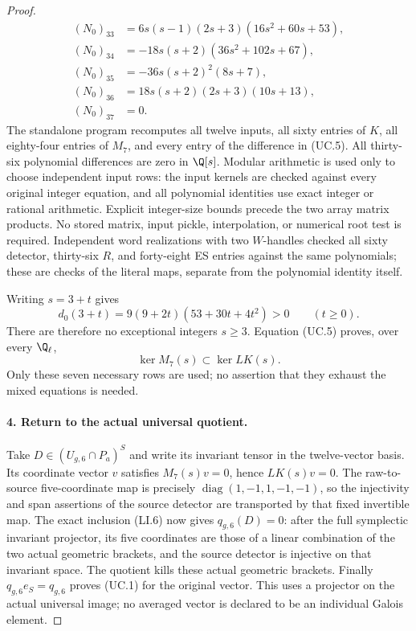\begin{proof}
\begin{align*}
 (N_0)_{33}&=6s(s-1)(2s+3)(16s^2+60s+53),\\
 (N_0)_{34}&=-18s(s+2)(36s^2+102s+67),\\
 (N_0)_{35}&=-36s(s+2)^2(8s+7),\\
 (N_0)_{36}&=18s(s+2)(2s+3)(10s+13),\\
 (N_0)_{37}&=0.
\end{align*}
The standalone program recomputes all twelve inputs,
all sixty entries of $K$, all eighty-four entries of
$M_7$, and every entry of the difference in (UC.5).
All thirty-six polynomial differences are zero in
$\Q[s]$. Modular arithmetic is used only to choose
independent input rows: the input kernels are checked
against every original integer equation, and all
polynomial identities use exact integer or rational
arithmetic. Explicit integer-size bounds precede the
two array matrix products. No stored matrix, input
pickle, interpolation, or numerical root test is required.
Independent word realizations with two $W$-handles
checked all sixty detector, thirty-six $R$, and
forty-eight ES entries against the same polynomials;
these are checks of the literal maps, separate from
the polynomial identity itself.

Writing $s=3+t$ gives
\[
                   d_0(3+t)=9(9+2t)(53+30t+4t^2)>0
                           \qquad(t\geq0).
\]
There are therefore no exceptional integers $s\geq3$.
Equation (UC.5) proves, over every $\Q_\ell$,
\[
                       \ker M_7(s)\subset\ker LK(s).
                                                               \tag{UC.6}
\]
Only these seven necessary rows are used; no assertion
that they exhaust the mixed equations is needed.

\paragraph{4. Return to the actual universal quotient.}
Take $D\in(U_{g,6}\cap P_a)^S$ and write its invariant
tensor in the twelve-vector basis. Its coordinate
vector $v$ satisfies $M_7(s)v=0$, hence $LK(s)v=0$.
The raw-to-source five-coordinate map is precisely
$\operatorname{diag}(1,-1,1,-1,-1)$, so the injectivity
and span assertions of the source detector are
transported by that fixed invertible map.
The exact inclusion (LI.6) now gives $q_{g,6}(D)=0$:
after the full symplectic invariant projector, its
five coordinates are those of a linear combination
of the two actual geometric brackets, and the
source detector is injective on that invariant
space. The quotient kills these actual geometric
brackets. Finally $q_{g,6}e_S=q_{g,6}$ proves (UC.1)
for the original vector. This uses a projector on
the actual universal image; no averaged vector is
declared to be an individual Galois element.


\end{proof}
